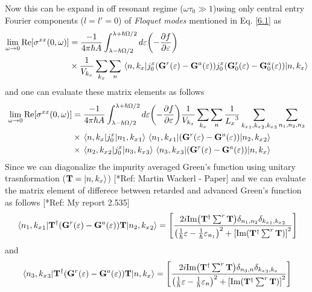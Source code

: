 \noindent
Now this can be expand in off resonant regime ($\omega\tau_0 \gg 1$)using only central entry Fourier components ($l=l'=0$) of \textit{Floquet modes} mentioned in Eq. \eqref{6.1} as
\begin{equation} \label{7.2}
  \begin{aligned}
    \lim_{\omega \to 0}
    \text{Re}[{\sigma}^{xx}(0,\omega)] & =
    \frac{-1}{4\pi\hbar A}
    \int_{\lambda-\hbar\Omega/2}^{\lambda+ \hbar\Omega/2} d\varepsilon
    \qty(
    -\frac{\partial f}{\partial \varepsilon})
    \\
    & \times
    \frac{1}{V_{k_x}} \sum_{k_x}
    \sum_{n}
    \mel{n,k_x}{
    {j}^x_0
    \qty(
    \mathbf{G}^{r} (\varepsilon) - \mathbf{G}^{a} (\varepsilon)
    )
    {j}^x_0
    \qty(
    \mathbf{G}^{r}_0 (\varepsilon) - \mathbf{G}^{a}_0 (\varepsilon)
    )
    }
    {n,k_x}
  \end{aligned}
\end{equation}
and one can evaluate these matrix elements as follows
\begin{equation} \label{7.3}
  \begin{aligned}
    \lim_{\omega \to 0}
    \text{Re}[{\sigma}^{xx}(0,\omega)] & =
    \frac{-1}{4\pi\hbar A}
    \int_{\lambda-\hbar\Omega/2}^{\lambda+ \hbar\Omega/2} d\varepsilon
    \qty(
    -\frac{\partial f}{\partial \varepsilon})
    \frac{1}{V_{k_x}} \sum_{k_x} \sum_{n}
    \frac{1}{{L_x}^3} \sum_{{k_x}_1,{k_x}_2,{k_x}_3}
    \sum_{n_1,n_2,n_3}
    \\
    & \times
    \mel{n,k_x}{
    {j}^x_0}
    {n_1,{k_x}_1}
    \mel{{n_1,{k_x}_1}}{
    \qty(
    \mathbf{G}^{r} (\varepsilon) - \mathbf{G}^{a} (\varepsilon)
    )}
    {n_2,{k_x}_2} \\
    & \times
    \mel{n_2,{k_x}_2}{
    {j}^x_0}
    {n_3,{k_x}_3}
    \mel{n_3,{k_x}_3}{
    \qty(
    \mathbf{G}^{r} (\varepsilon) - \mathbf{G}^{a} (\varepsilon)
    )
    }
    {n,k_x}
  \end{aligned}
\end{equation}
Since we can diagonalize the impurity averaged Green's function using unitary trasnformation ($\mathbf{T} = \ket{n,k_x}$) [*Ref: Martin Wackerl - Paper] and we can evaluate the matrix element of differece between retarded and advanced Green's function as follows
[*Ref: My report 2.535]
\begin{equation} \label{7.4}
  \mel{{n_1,{k_x}_1}}{
  \mathbf{T}^{\dagger}
  \qty(
  \mathbf{G}^{r} (\varepsilon) - \mathbf{G}^{a} (\varepsilon)
  )\mathbf{T}}
  {n_2,{k_x}_2} =
  \qty[
  \frac{2i \text{Im}\qty(\mathbf{T}^{\dagger} \sum^r \mathbf{T})
  \delta_{n_1,n_2}\delta_{{k_x}_1,{k_x}_2}}
  {
  \qty(
  \frac{1}{\hbar}\varepsilon -
  \frac{1}{\hbar}\varepsilon_{n_1}
  )^2
  + \qty[\text{Im}\qty(\mathbf{T}^{\dagger} \sum^r \mathbf{T})]^2
  }]
\end{equation}
and
\begin{equation} \label{7.5}
  \mel{{n_3,{k_x}_3}}{
  \mathbf{T}^{\dagger}
  \qty(
  \mathbf{G}^{r} (\varepsilon) - \mathbf{G}^{a} (\varepsilon)
  )\mathbf{T}}
  {n,{k_x}} =
  \qty[
  \frac{2i \text{Im}\qty(\mathbf{T}^{\dagger} \sum^r \mathbf{T})
  \delta_{n_3,n}\delta_{{k_x}_3,{k_x}}}
  {
  \qty(
  \frac{1}{\hbar}\varepsilon -
  \frac{1}{\hbar}\varepsilon_{n}
  )^2
  + \qty[\text{Im}\qty(\mathbf{T}^{\dagger} \sum^r \mathbf{T})]^2
  }]
\end{equation}

